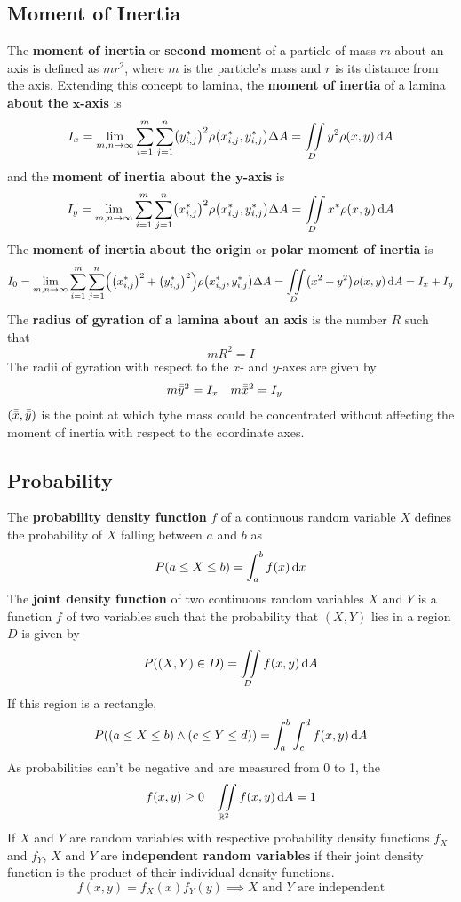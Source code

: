 \documentclass[../Calculus \Roman{3}.tex]{subfiles}
\begin{document}
		\subsection*{Moment of Inertia}
			The \textbf{moment of inertia} or \textbf{second moment} of a particle of mass $m$ about an axis is defined as $mr^2$, where $m$ is the particle's mass and $r$ is its distance from the axis. Extending this concept to lamina, the \textbf{moment of inertia} of a lamina \textbf{about the $\bm{x}$-axis} is
				\[
					I_x = \lim_{m, n \to \infty}\sum_{i = 1}^m\sum_{j = 1}^n\bigl(y_{i, j}^*\bigr)^2\rho\bigl(x_{i, j}^*, y_{i, j}^*\bigr)\Delta A
							= \iint\limits_D y^2\rho(x, y)\,\mathrm{d} A
				\]
				and the \textbf{moment of inertia about the $\bm{y}$-axis} is
					\[
						I_y = \lim_{m, n \to \infty}\sum_{i = 1}^m\sum_{j = 1}^n\bigl(x_{i, j}^*\bigr)^2\rho\bigl(x_{i, j}^*, y_{i, j}^*\bigr)\Delta A
								= \iint\limits_D x^*\rho(x, y)\,\mathrm{d} A
					\]
			The \textbf{moment of inertia about the origin} or \textbf{polar moment of inertia} is
				\[
					I_0 = \lim_{m, n \to \infty}\sum_{i = 1}^m\sum_{j = 1}^n\Bigl(\bigl(x_{i, j}^*\bigr)^2 + \bigl(y_{i, j}^*\bigr)^2\Bigr)\rho\bigl(x_{i, j}^*, y_{i, j}^*\bigr)\Delta A
							= \iint\limits_D \bigl(x^2 + y^2\bigr)\rho(x, y)\,\mathrm{d} A
							= I_x + I_y
				\]
			The \textbf{radius of gyration of a lamina about an axis} is the number $R$ such that
				\[mR^2 = I\]
				The radii of gyration with respect to the $x$- and $y$-axes are given by
					\begin{align*}
						m\bar{\bar{y}}^2 &= I_x &
								m\bar{\bar{x}}^2 &= I_y
					\end{align*}
					$(\bar{\bar{x}}, \bar{\bar{y}})$ is the point at which tyhe mass could be concentrated without affecting the moment of inertia with respect to the coordinate axes.
		\subsection*{Probability}
			The \textbf{probability density function} $f$ of a continuous random variable $X$ defines the probability of $X$ falling between $a$ and $b$ as
				\[P(a \le X \le b) = \int_a^b f(x)\,\mathrm{d} x\]
				The \textbf{joint density function} of two continuous random variables $X$ and $Y$ is a function $f$ of two variables such that the probability that $(X, Y)$ lies in a region $D$ is given by
					\[P((X, Y) \in D) = \iint\limits_D f(x, y)\,\mathrm{d} A\]
				If this region is a rectangle,
					\[P((a \le X \le b) \land (c \le Y \le d)) = \int_a^b\int_c^d f(x, y)\,\mathrm{d} A\]
				As probabilities can't be negative and are measured from 0 to 1, the
					\begin{align*}
						f(x, y) &\ge 0 &
							\iint\limits_{\mathbb{R}^2} f(x, y)\,\mathrm{d} A = 1
					\end{align*}
			If $X$ and $Y$ are random variables with respective probability density functions $f_X$ and $f_Y$, $X$ and $Y$ are \textbf{independent random variables} if their joint density function is the product of their individual density functions.
				\[f(x, y) = f_X(x)f_Y(y) \implies \text{$X$ and $Y$ are independent}\]
\end{document}
